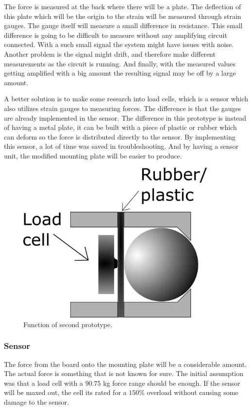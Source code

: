 The force is measured at the back where there will be a plate. The deflection of this plate which will be the origin to the strain will be measured through strain gauges. 
The gauge itself will measure a small difference in resistance. This small difference is going to be difficult to measure without any amplifying circuit connected. With a such small signal the system might have issues with noise. Another problem is the signal might drift, and therefore make different measurements as the circuit is running. And finally, with the measured values getting amplified with a big amount the resulting signal may be off by a large amount. 

A better solution is to make some research into load cells, which is a sensor which also utilizes strain gauges to measuring forces. The difference is that the gauges are already implemented in the sensor. The difference in this prototype is instead of having a metal plate, it can be built with a piece of plastic or rubber which can deform so the force is distributed directly to the sensor. By implementing this sensor, a lot of time was saved in troubleshooting. And by having a sensor unit, the modified mounting plate will be easier to produce. 
 
\begin{figure}[H]
\begin{center}
	\includegraphics[width = 10cm]{Figures/Press_sens_func_2.png}
	\caption{Function of second prototype.}
	\label{Press_sens_prot_2}
\end{center}
\end{figure}


\subsubsection{Sensor}
The force from the board onto the mounting plate will be a considerable amount. The actual force is something that is not known for sure. The initial assumption was that a load cell with a $90.75$ kg force range should be enough. If the sensor will be maxed out, the cell its rated for a $150\%$ overload without causing some damage to the sensor.  

